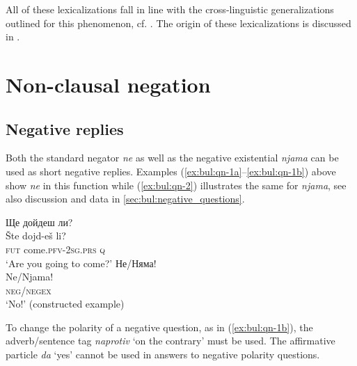 \documentclass[output=paper,colorlinks=true, citecolor=brown]{langscibook}
\begin{document}
All of these lexicalizations fall in line with the cross-linguistic generalizations outlined for this phenomenon, cf. \citet{Veselinova2013lexicalization}. The origin of these lexicalizations is discussed in .


\section{Non-clausal negation}\label{sec:bul:non-clausal-negation}
\subsection{Negative replies}\label{sec:bul:negative-replies}
Both the standard negator \textit{ne} as well as the negative existential \textit{njama} can be used as short negative replies. Examples (\ref{ex:bul:qn-1a}--\ref{ex:bul:qn-1b}) above show \textit{ne} in this function while (\ref{ex:bul:qn-2}) illustrates the same for \textit{njama}, see also discussion and data in \ref{sec:bul:negative_questions}.

\ea \label{ex:bul:qn-2}
    \begin{xlist}[B: ]
    Ще дойдеш ли? \\
        \gll Šte dojd-eš li? \\ 
             \textsc{fut} come.\textsc{pfv}-\textsc{2sg.prs} \textsc{q}\\ 
        \glt `Are you going to come?'
    Не\slash Няма!  \\ 
        \gll Ne\slash Njama! \\ 
             \textsc{neg}\slash \textsc{negex} \\
        \glt `No!' (constructed example)
    \end{xlist}
\z 

To change the polarity of a negative question, as in (\ref{ex:bul:qn-1b}), the adverb/sentence tag \textit{naprotiv} `on the contrary' must be used. The affirmative particle \textit{da} `yes' cannot be used in answers to negative polarity questions.
\end{document}
